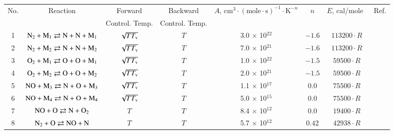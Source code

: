 \documentclass{warpdoc}
\renewcommand{\fontsizetable}{\footnotesize\scalefont{0.9}}
\begin{document}
%
\begin{table}[t]
\fontsizetable
\begin{center}
\begin{threeparttable}
\begin{tabular}{cccccccc} 
\toprule
No. & Reaction\tnote{(b)} & Forward          & Backward    & $A$, $\textrm{cm}^3\cdot(\textrm{mole}\cdot \textrm{s})^{-1}\cdot \textrm{K}^{-n}$ & $n$ & $E$, cal/mole~\tnote{(a)} & Ref.\\ 
~   & ~                   & Control. Temp.   & Control. Temp.\tnote{(c)} &~ & ~ & ~ & ~\\
\midrule
1 & $\rm N_2 + M_1 \rightleftarrows N + N + M_1$ & $\sqrt{T T_{\rm v}}$ & $T$ & 3.0 $\times$ 10$^{22}$  & $-1.6$ & $113200 \cdot R$ & \cite{book:1990:park}\\

2 & $\rm N_2 + M_2 \rightleftarrows N + N + M_2$ & $\sqrt{T T_{\rm v}}$ & $T$ & 7.0 $\times$ 10$^{21}$  & $-1.6$ & $113200 \cdot R$ & \cite{book:1990:park}\\


3 & $\rm O_2 + M_1 \rightleftarrows O + O + M_1$ & $\sqrt{T T_{\rm v}}$ & $T$ & 1.0 $\times$ 10$^{22}$  & $-1.5$ & $59500 \cdot R$ & \cite{book:1990:park}\\

4 & $\rm O_2 + M_2 \rightleftarrows O + O + M_2$ & $\sqrt{T T_{\rm v}}$ & $T$ & 2.0 $\times$ 10$^{21}$  & $-1.5$ & $59500 \cdot R$ & \cite{book:1990:park}\\

5 & $\rm NO + M_3 \rightleftarrows N + O + M_3$ & $\sqrt{T T_{\rm v}}$ & $T$ & 1.1 $\times$ 10$^{17}$  & 0.0 & $75500 \cdot R$ & \cite{book:1990:park}\\

6 & $\rm NO + M_4 \rightleftarrows N + O + M_4$ & $\sqrt{T T_{\rm v}}$ & $T$ & 5.0 $\times$ 10$^{15}$  & 0.0 & $75500 \cdot R$ & \cite{book:1990:park}\\



7 & $\rm NO + O \rightleftarrows N + O_2 $ & $T$ & $T$ & 8.4 $\times$ 10$^{12}$  & 0.0 & $19400 \cdot R$ & \cite{jcp:1997:bose}\\

8 & $\rm N_2 + O \rightleftarrows NO + N $ & $T$ & $T$ & 5.7 $\times$ 10$^{12}$  & $0.42$ & $42938 \cdot R$ & \cite{jcp:1996:bose}\\



\end{tabular}
\end{threeparttable}
\end{center}
\end{table}
\end{document}
